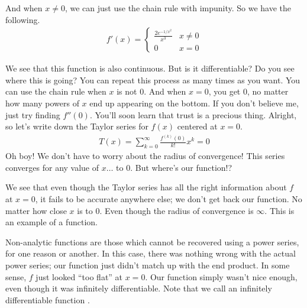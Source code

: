 \documentclass{ximera}
\begin{document}
\begin{exercise}
\begin{exercise}
		\begin{exercise}
			And when $x \neq 0$, we can just use the chain rule with impunity. So we have the following.
			\begin{align*}
				f'(x)= 
				\begin{cases}
				\frac{2e^{-1/x^2}}{x^3}  &x \neq 0 \\
				0 &x=0
				\end{cases}
			\end{align*}
		\end{exercise}
		We see that this function is also continuous. But is it differentiable? Do you see where this is going? You can repeat this process as many times as you want. You can use the chain rule when $x$ is not $0$. And when $x=0$, you get $0$, no matter how many powers of $x$ end up appearing on the bottom. If you don't believe me, just try finding $f''(0)$. You'll soon learn that trust is a precious thing. Alright, so let's write down the Taylor series for $f(x)$ centered at $x=0$.
		\begin{align*}
			T(x) = \sum_{k=0}^{\infty} \frac{f^{(k)}(0)}{k!} x^k = 0
		\end{align*}
		Oh boy! We don't have to worry about the radius of convergence! This series converges for any value of $x\ldots$ to $0$. But where's our function!?
		
		We see that even though the Taylor series has all the right information about $f$ at $x=0$, it fails to be accurate anywhere else; we don't get back our function. No matter how close $x$ is to 0. Even though the radius of convergence is $\infty$. This is an example of a  function. 
		
		Non-analytic functions are those which cannot be recovered using a power series, for one reason or another. In this case, there was nothing wrong with the actual power series; our function just didn't match up with the end product. In some sense, $f$ just looked ``too flat'' at $x=0$. Our function simply wasn't nice enough, even though it was infinitely differentiable. Note that we call an infinitely differentiable function .
		

\end{exercise}
\end{exercise}
\end{document}
